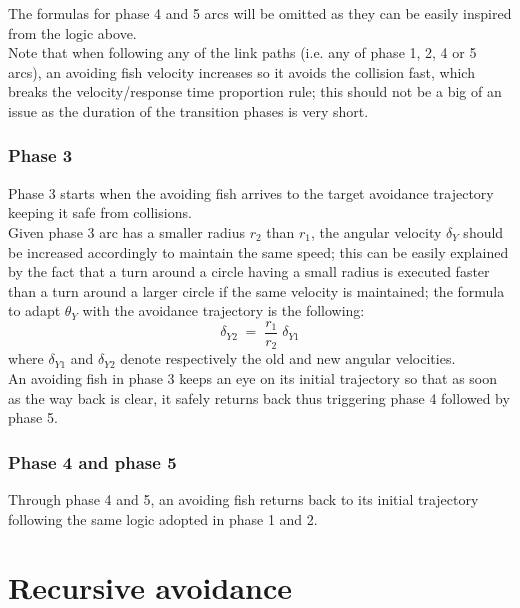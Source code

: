 \bigskip
The formulas for phase 4 and 5 arcs will be omitted as they can be easily inspired from the logic above.\\

Note that when following any of the link paths (i.e. any of phase 1, 2, 4 or 5 arcs), an avoiding fish velocity increases so it avoids the collision fast, which breaks the velocity/response time proportion rule; this should not be a big of an issue as the duration of the transition phases is very short.

\subsubsection{Phase 3}
Phase 3 starts when the avoiding fish arrives to the target avoidance trajectory keeping it safe from collisions.\\

Given phase 3 arc has a smaller radius $r_2$ than $r_1$, the angular velocity $\delta_Y$ should be increased accordingly to maintain the same speed; this can be easily explained by the fact that a turn around a circle having a small radius is executed faster than a turn around a larger circle if the same velocity is maintained; the formula to adapt $\theta_Y$ with the avoidance trajectory is the following: 
\[
\delta_{Y2} \; = \; \frac{r_1}{r_2} \; \delta_{Y1}
\]
where $\delta_{Y1}$ and $\delta_{Y2}$ denote respectively the old and new angular velocities.\\

An avoiding fish in phase 3 keeps an eye on its initial trajectory so that as soon as the way back is clear, it safely returns back thus triggering phase 4 followed by phase 5.

\subsubsection{Phase 4 and phase 5}

Through phase 4 and 5, an avoiding fish returns back to its initial trajectory following the same logic adopted in phase 1 and 2.

\section{Recursive avoidance}
\label{sec:recursive-avoidance}

